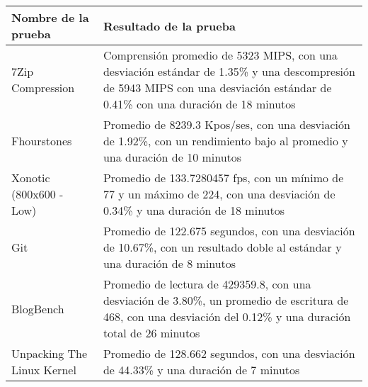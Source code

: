 \documentclass[12pt]{article}
\begin{document}
\begin{table}[!htb]
    \centering
    \begin{tabular}{|p{5cm}|p{9cm}|}
        \hline
        \textbf{Nombre de la prueba} & \textbf{Resultado de la prueba}\\
        \hline
        7Zip Compression & Comprensión promedio de 5323 MIPS, \newline
        con una desviación estándar de 1.35\% \newline
        y una descompresión de 5943 MIPS \newline
        con una desviación estándar de 0.41\% con una duración de 18 minutos\\
        \hline
        Fhourstones & Promedio de 8239.3 Kpos/ses, \newline
        con una desviación de 1.92\%, \newline
        con un rendimiento bajo al promedio \newline
        y una duración de 10 minutos \\
        \hline
        Xonotic (800x600 - Low) & Promedio de 133.7280457 fps, \newline
        con un mínimo de 77 y un máximo de 224, \newline
        con una desviación de 0.34\% \newline
        y una duración de 18 minutos \\
        \hline
        Git & Promedio de 122.675 segundos, \newline
        con una desviación de 10.67\%, \newline
        con un resultado doble al estándar \newline
        y una duración de 8 minutos \\
        \hline
        BlogBench & Promedio de lectura de 429359.8, \newline
        con una desviación de 3.80\%, \newline
        un promedio de escritura de 468, \newline
        con una desviación del 0.12\% \newline
        y una duración total de 26 minutos \\
        \hline
        Unpacking The Linux Kernel & Promedio de 128.662 segundos, \newline
        con una desviación de 44.33\% \newline
        y una duración de 7 minutos \\

\end{tabular}
\end{table}
\end{document}
